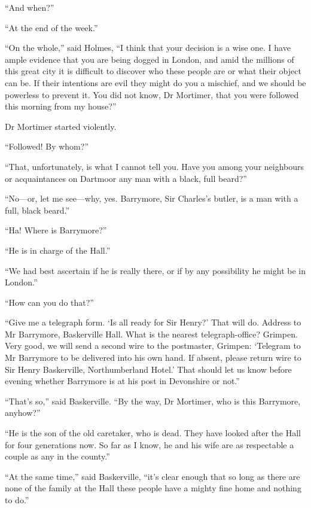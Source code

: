\documentclass[paper=5.5in:8.5in,BCOR=7mm,twoside,DIV=calc,12pt,usegeometry,openany,chapterprefix,endperiod]{scrbook} %
\begin{document}
\enquote{And when?}

\enquote{At the end of the week.}

\enquote{On the whole,} said Holmes, \enquote{I think that your decision is a wise one. I have ample evidence that you are being dogged in London, and amid the millions of this great city it is difficult to discover who these people are or what their object can be. If their intentions are evil they might do you a mischief, and we should be powerless to prevent it. You did not know, Dr Mortimer, that you were followed this morning from my house?}

Dr Mortimer started violently.

\enquote{Followed! By whom?}

\enquote{That, unfortunately, is what I cannot tell you. Have you among your neighbours or acquaintances on Dartmoor any man with a black, full beard?}

\enquote{No\nobreakdash---or, let me see\nobreakdash---why, yes. Barrymore, Sir Charles's butler, is a man with a full, black beard.}

\enquote{Ha! Where is Barrymore?}

\enquote{He is in charge of the Hall.}

\enquote{We had best ascertain if he is really there, or if by any possibility he might be in London.}

\enquote{How can you do that?}

\enquote{Give me a telegraph form. \enquote{Is all ready for Sir Henry?} That will do. Address to Mr Barrymore, Baskerville Hall. What is the nearest telegraph-office? Grimpen. Very good, we will send a second wire to the postmaster, Grimpen: \enquote{Telegram to Mr Barrymore to be delivered into his own hand. If absent, please return wire to Sir Henry Baskerville, Northumberland Hotel.} That should let us know before evening whether Barrymore is at his post in Devonshire or not.}

\enquote{That's so,} said Baskerville. \enquote{By the way, Dr Mortimer, who is this Barrymore, anyhow?}

\enquote{He is the son of the old caretaker, who is dead. They have looked after the Hall for four generations now. So far as I know, he and his wife are as respectable a couple as any in the county.}

\enquote{At the same time,} said Baskerville, \enquote{it's clear enough that so long as there are none of the family at the Hall these people have a mighty fine home and nothing to do.}
\end{document}
